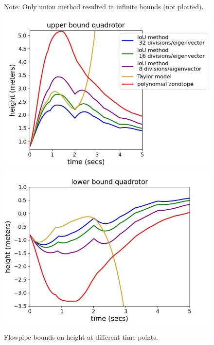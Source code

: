 \begin{figure}
{\normalsize $\text{Note: Only union method resulted in infinite bounds (not plotted).}$}
\includegraphics[scale = 0.65]{quadrotorImages/ubToolHeight.png}\vspace{-0.4em}
\includegraphics[scale = 0.6]{quadrotorImages/lbToolHeight.png}
\caption{Flowpipe bounds on height at different time points.}\label{fig:flowquadrotor}
\end{figure}
